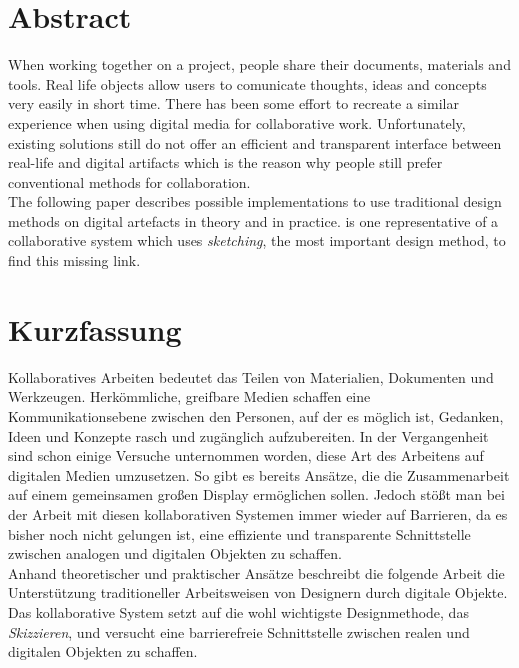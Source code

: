 \begingroup
\let\clearpage\relax
\let\cleardoublepage\relax
\let\cleardoublepage\relax

\chapter*{Abstract}
When working together on a project, people share their documents, materials and tools. Real life objects allow users to comunicate thoughts, ideas and concepts very easily in short time. There has been some effort to recreate a similar experience when using digital media for collaborative work. Unfortunately, existing solutions still do not offer an efficient and transparent interface between real-life and digital artifacts which is the reason why people still prefer conventional methods for collaboration. \\
The following paper describes possible implementations to use traditional design methods on digital artefacts in theory and in practice. \scribbler is one representative of a collaborative system which uses \emph{sketching}, the most important design method, to find this missing link.

\vfill

\chapter*{Kurzfassung}
Kollaboratives Arbeiten bedeutet das Teilen von Materialien, Dokumenten und Werkzeugen. Herkömmliche, greifbare Medien schaffen eine Kommunikationsebene zwischen den Personen, auf der es möglich ist, Gedanken, Ideen und Konzepte rasch und zugänglich aufzubereiten. In der Vergangenheit sind schon einige Versuche unternommen worden, diese Art des Arbeitens auf digitalen Medien umzusetzen. So gibt es bereits Ansätze, die die Zusammenarbeit auf einem gemeinsamen großen Display ermöglichen sollen. Jedoch stößt man bei der Arbeit mit diesen kollaborativen Systemen immer wieder auf Barrieren, da es bisher noch nicht gelungen ist, eine effiziente und transparente Schnittstelle zwischen analogen und digitalen Objekten zu schaffen.\\
Anhand theoretischer und praktischer Ansätze beschreibt die folgende Arbeit die Unterstützung traditioneller Arbeitsweisen von Designern durch digitale Objekte. Das kollaborative System \scribbler setzt auf die wohl wichtigste Designmethode, das \emph{Skizzieren}, und versucht eine barrierefreie Schnittstelle zwischen realen und digitalen Objekten zu schaffen.

\endgroup			

\vfill